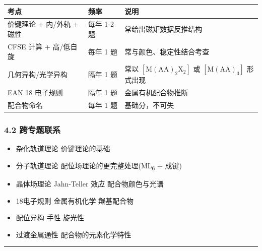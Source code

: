 {\def\LTcaptype{none} %
\begin{longtable}[]{@{}
  >{\raggedright\arraybackslash}p{}
  >{\centering\arraybackslash}p{}
  >{\raggedright\arraybackslash}p{}@{}}
\toprule\noalign{}
\begin{minipage}[b]{\linewidth}\raggedright
考点
\end{minipage} & \begin{minipage}[b]{\linewidth}\centering
频率
\end{minipage} & \begin{minipage}[b]{\linewidth}\raggedright
说明
\end{minipage} \\
\midrule\noalign{}
\endhead
\bottomrule\noalign{}
\endlastfoot
价键理论 + 内/外轨 + 磁性 & 每年 1-2 题 & 常给出磁矩数据反推结构 \\
CFSE 计算 + 高/低自旋 & 每年 1 题 & 常与颜色、稳定性结合考查 \\
几何异构/光学异构 & 隔年 1 题 & 常以 \([\mathrm{M(AA)_2X_2}]\) 或 \([\mathrm{M(AA)_3}]\) 形式出现 \\
EAN 18 电子规则 & 隔年 1 题 & 金属有机配合物推断 \\
配合物命名 & 每年 1 题 & 基础分，不可失 \\
\end{longtable}
}

\subsubsection{4.2 跨专题联系}\label{ux8de8ux4e13ux9898ux8054ux7cfb}

\begin{itemize}
\tightlist
\item
  杂化轨道理论 \箭 价键理论的基础
\item
  分子轨道理论 \箭 配位场理论的更完整处理(ML\textsubscript{6}  + \派 成键)
\item
  晶体场理论 \箭 Jahn-Teller 效应 \箭 配合物颜色与光谱
\item
  18电子规则 \箭 金属有机化学 \箭 羰基配合物
\item
  配位异构 \箭 手性 \箭 旋光性
\item
  过渡金属通性 \箭 配合物的元素化学特性
\end{itemize}

\begin{center}\rule{0.5\linewidth}{0.5pt}\end{center}

